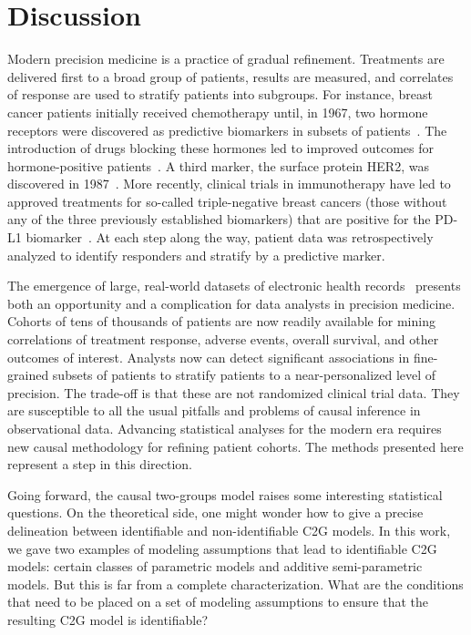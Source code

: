 \section{Discussion}

%
%
Modern precision medicine is a practice of gradual refinement. Treatments are delivered first to a broad group of patients, results are measured, and correlates of response are used to stratify patients into subgroups. For instance, breast cancer patients initially received chemotherapy until, in 1967, two hormone receptors were discovered as predictive biomarkers in subsets of patients~\citep{jensen:etal:1981:er-pr-breast-cancer-discovery}. The introduction of drugs blocking these hormones led to improved outcomes for hormone-positive patients~\citep{ward:etal:1973:breast-er-trial,osborne:etal:1980:value-er-pr-breast}. A third marker, the surface protein HER2, was discovered in 1987~\citep{slamon:etal:1987:her2-breast-cancer-discovery}. More recently, clinical trials in immunotherapy have led to approved treatments for so-called triple-negative breast cancers (those without any of the three previously established biomarkers) that are positive for the PD-L1 biomarker~\citep{emens:etal:2021:tnbc-nab-pac-atezo-trial}. At each step along the way, patient data was retrospectively analyzed to identify responders and stratify by a predictive marker.

The emergence of large, real-world datasets of electronic health records~\citep[e.g.][]{jee:etal:2024:msk-chord} presents both an opportunity and a complication for data analysts in precision medicine. Cohorts of tens of thousands of patients are now readily available for mining correlations of treatment response, adverse events, overall survival, and other outcomes of interest. Analysts now can detect significant associations in fine-grained subsets of patients to stratify patients to a near-personalized level of precision. The trade-off is that these are not randomized clinical trial data. They are susceptible to all the usual pitfalls and problems of causal inference in observational data. Advancing statistical analyses for the modern era requires new causal methodology for refining patient cohorts. The methods presented here represent a step in this direction.

Going forward, the causal two-groups model raises some interesting statistical questions. On the theoretical side, one might wonder how to give a precise delineation between identifiable and non-identifiable C2G models. In this work, we gave two examples of modeling assumptions that lead to identifiable C2G models: certain classes of parametric models and additive semi-parametric models. But this is far from a complete characterization. What are the conditions that need to be placed on a set of modeling assumptions to ensure that the resulting C2G model is identifiable? 



